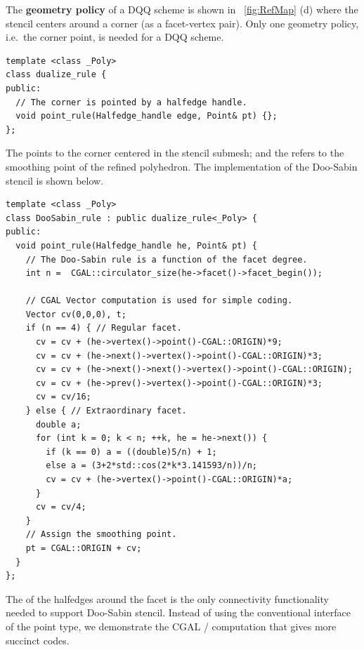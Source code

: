 \noindent The \textbf{geometry policy} of a DQQ scheme is shown in
\figurename\ \ref{fig:RefMap} (d) where the stencil centers around
a corner (as a facet-vertex pair). Only one geometry policy, i.e.\ the 
corner point, is needed for a DQQ scheme. 
\begin{lstlisting}
template <class _Poly>
class dualize_rule {
public:
  // The corner is pointed by a halfedge handle.
  void point_rule(Halfedge_handle edge, Point& pt) {};
};
\end{lstlisting}
The  points to the 
corner centered in the stencil submesh; and the 
 refers to the smoothing point
of the refined polyhedron. The implementation of the
Doo-Sabin stencil is shown below.
\begin{lstlisting}
template <class _Poly>
class DooSabin_rule : public dualize_rule<_Poly> {
public:
  void point_rule(Halfedge_handle he, Point& pt) {
    // The Doo-Sabin rule is a function of the facet degree.
    int n =  CGAL::circulator_size(he->facet()->facet_begin());

    // CGAL Vector computation is used for simple coding.
    Vector cv(0,0,0), t;
    if (n == 4) { // Regular facet.
      cv = cv + (he->vertex()->point()-CGAL::ORIGIN)*9;
      cv = cv + (he->next()->vertex()->point()-CGAL::ORIGIN)*3;
      cv = cv + (he->next()->next()->vertex()->point()-CGAL::ORIGIN);
      cv = cv + (he->prev()->vertex()->point()-CGAL::ORIGIN)*3;
      cv = cv/16;
    } else { // Extraordinary facet.
      double a;
      for (int k = 0; k < n; ++k, he = he->next()) {
        if (k == 0) a = ((double)5/n) + 1;
        else a = (3+2*std::cos(2*k*3.141593/n))/n;
        cv = cv + (he->vertex()->point()-CGAL::ORIGIN)*a;
      }
      cv = cv/4;
    }
    // Assign the smoothing point.
    pt = CGAL::ORIGIN + cv;
  }
};
\end{lstlisting}
The  of the halfedges around the 
facet is the only connectivity functionality needed 
to support Doo-Sabin stencil. 
Instead of using the conventional interface \CodeFmt{[i]} 
of the point type, we demonstrate the CGAL 
/ computation that gives
more succinct codes. 
\\


